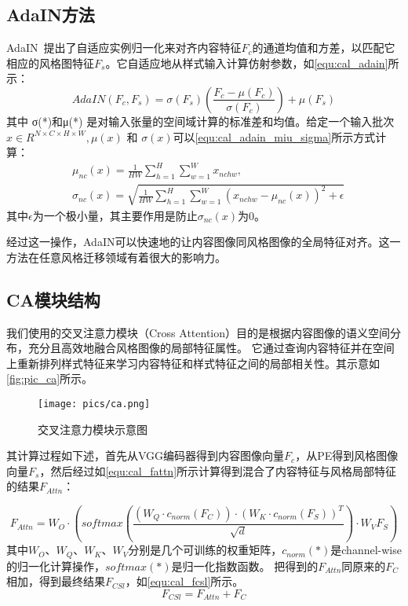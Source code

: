 \subsection{AdaIN方法}
AdaIN~\cite{huang2017arbitrary}提出了自适应实例归一化来对齐内容特征$F_c$的通道均值和方差，以匹配它相应的风格图特征$F_s$。它自适应地从样式输入计算仿射参数，如\autoref{equ:cal_adain}所示：
\begin{equation}
    \label{equ:cal_adain}
    AdaIN(F_c,F_s)=\sigma(F_s)\left(\frac{F_c-\mu(F_c)}{\sigma(F_c)}\right)+\mu(F_s)
\end{equation}
其中 σ(*)和μ(*) 是对输入张量的空间域计算的标准差和均值。给定一个输入批次$x\in R^{N\times C\times H\times W},\mu(x)\text{ 和 }\sigma(x)$可以\autoref{equ:cal_adain_miu_sigma}所示方式计算：
\begin{equation}
    \label{equ:cal_adain_miu_sigma}
    \begin{aligned}
        &\mu_{nc}(x) =\frac1{HW}\sum_{h=1}^H\sum_{w=1}^Wx_{nchw}, \\
        &\sigma_{nc}(x) =\sqrt{\frac1{HW}\sum_{h=1}^H\sum_{w=1}^W\left(x_{nchw}-\mu_{nc}(x)\right)^2+\epsilon} 
        \end{aligned}
\end{equation}
其中$\epsilon$为一个极小量，其主要作用是防止$\sigma_{nc} (x)$为0。
\par 经过这一操作，AdaIN可以快速地的让内容图像同风格图像的全局特征对齐。这一方法在任意风格迁移领域有着很大的影响力。

\subsection{CA模块结构}
我们使用的交叉注意力模块（Cross Attention）目的是根据内容图像的语义空间分布，充分且高效地融合风格图像的局部特征属性。
它通过查询内容特征并在空间上重新排列样式特征来学习内容特征和样式特征之间的局部相关性。其示意如\autoref{fig:pic_ca}所示。
\begin{figure}[htbp]
    \centering
    \texttt{[image: pics/ca.png]}
    \caption{\label{fig:pic_ca}交叉注意力模块示意图}
\end{figure}
其计算过程如下述，首先从VGG编码器得到内容图像向量$F_c$，从PE得到风格图像向量$F_s$，然后经过如\autoref{equ:cal_fattn}所示计算得到混合了内容特征与风格局部特征的结果$F_{Attn}$：

\begin{equation}
    \label{equ:cal_fattn}
    F_{Attn}=W_O\cdot(softmax\left(\frac{(W_Q\cdot c_{norm}(F_C))\cdot(W_K\cdot c_{norm}(F_S))^T}{\sqrt{d}}\right)\cdot W_VF_S)
\end{equation}
其中$W_O$、$W_Q$、$W_K$、$W_V$分别是几个可训练的权重矩阵，$c_{norm} (*)$是channel-wise的归一化计算操作，$softmax(*)$是归一化指数函数。
把得到的$F_{Attn}$同原来的$F_C$相加，得到最终结果$F_{CSl}$，如\autoref{equ:cal_fcsl}所示。
\begin{equation}
    \label{equ:cal_fcsl}
    F_{CSl}=F_{Attn}+F_C
\end{equation}

